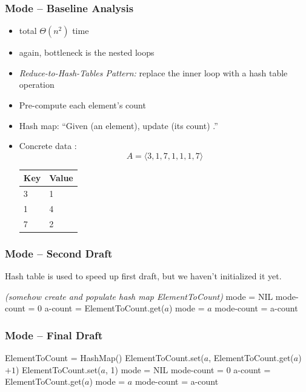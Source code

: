 \documentclass[10pt,aspectratio=169]{beamer}
\begin{document}
\begin{frame} \frametitle{Mode -- Baseline Analysis}
  \begin{itemize}
    \item total $\Theta(n^2)$ time
    \item again, bottleneck is the nested loops
    \item \emph{Reduce-to-Hash-Tables Pattern:} replace the inner loop with a hash table operation
    \item Pre-compute each element's count
    \item Hash map:  ``Given (an element), update (its count) .''
    \item Concrete data :
    \[A = \langle 3, 1, 7, 1, 1, 1, 7 \rangle \]
    \begin{center}
      \begin{tabular}{ll}
        \textbf{Key} & \textbf{Value} \\ \hline
        3 & 1 \\
        1 & 4 \\
        7 & 2 \\
      \end{tabular}
    \end{center}
  \end{itemize}
\end{frame}


\begin{frame} \frametitle{Mode -- Second Draft}
  Hash table is used to speed up first draft, but we haven't initialized it yet.
  \vspace{12pt}

  {\footnotesize
  \begin{algorithmic}[1]
    \State \emph{(somehow create and populate hash map ElementToCount)}
    \State mode = NIL
    \State mode-count = 0
        \State a-count = ElementToCount.get($a$)
          \State mode = $a$
          \State mode-count = a-count
      \EndIf
    \EndFor
    \State {}
    \EndFunction
  \end{algorithmic}
  }
\end{frame}


\begin{frame} \frametitle{Mode -- Final Draft}
  {\footnotesize
  \begin{algorithmic}[1]
    \State ElementToCount = HashMap()
        \State ElementToCount.set($a$, ElementToCount.get($a$) $+ 1$)
      \Else
        \State ElementToCount.set($a$, 1)
      \EndIf
    \EndFor
    \State mode = NIL
    \State mode-count = 0
        \State a-count = ElementToCount.get($a$)
          \State mode = $a$
          \State mode-count = a-count
      \EndIf
    \EndFor
    \State {}
    \EndFunction
  \end{algorithmic}
  }
\end{frame}
\end{document}
